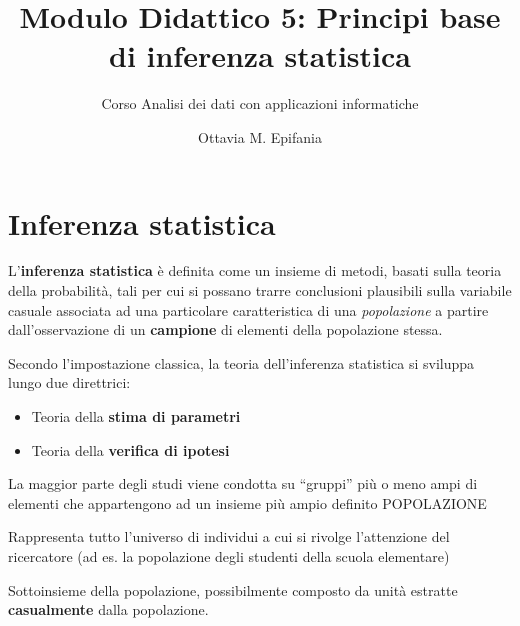 \documentclass[
  ignorenonframetext,
  compress, aspectratio=149]{beamer}
\title{Modulo Didattico 5: Principi base di inferenza statistica}
\subtitle{Corso Analisi dei dati con applicazioni informatiche}
\author{Ottavia M. Epifania}
\date{}
\providecommand{\tightlist}{%
  \setlength{\itemsep}{0pt}\setlength{\parskip}{0pt}}
\begin{document}
\frame{\titlepage}


\section{Inferenza statistica}\label{inferenza-statistica}

\begin{frame}{}
\label{section}
L'\textbf{inferenza statistica} è definita come un insieme di metodi,
basati sulla teoria della probabilità, tali per cui si possano trarre
conclusioni plausibili sulla variabile casuale associata ad una
particolare caratteristica di una \emph{popolazione} a partire
dall'osservazione di un \textbf{campione} di elementi della popolazione
stessa.

\vspace{3mm}

Secondo l'impostazione classica, la teoria dell'inferenza statistica si
sviluppa lungo due direttrici:

\begin{itemize}
\tightlist
\item
  Teoria della \textbf{stima di parametri}
\item
  Teoria della \textbf{verifica di ipotesi}
\end{itemize}
\end{frame}

\begin{frame}{}
\label{section-1}
La maggior parte degli studi viene condotta su ``gruppi'' più o meno
ampi di elementi che appartengono ad un insieme più ampio definito
POPOLAZIONE

\begin{tcolorbox}[enhanced jigsaw, opacityback=0, arc=.35mm, opacitybacktitle=0.6, rightrule=.15mm, breakable, titlerule=0mm, leftrule=.75mm, title={Popolazione}, toprule=.15mm, toptitle=1mm, coltitle=black, bottomrule=.15mm, bottomtitle=1mm, left=2mm, colframe=quarto-callout-tip-color-frame, colback=white, colbacktitle=quarto-callout-tip-color!10!white]

Rappresenta tutto l'universo di individui a cui si rivolge l'attenzione
del ricercatore (ad es. la popolazione degli studenti della scuola
elementare)

\end{tcolorbox}

\begin{tcolorbox}[enhanced jigsaw, opacityback=0, arc=.35mm, opacitybacktitle=0.6, rightrule=.15mm, breakable, titlerule=0mm, leftrule=.75mm, title={Campione}, toprule=.15mm, toptitle=1mm, coltitle=black, bottomrule=.15mm, bottomtitle=1mm, left=2mm, colframe=quarto-callout-tip-color-frame, colback=white, colbacktitle=quarto-callout-tip-color!10!white]

Sottoinsieme della popolazione, possibilmente composto da unità estratte
\textbf{casualmente} dalla popolazione.

\end{tcolorbox}
\end{frame}
\end{document}
